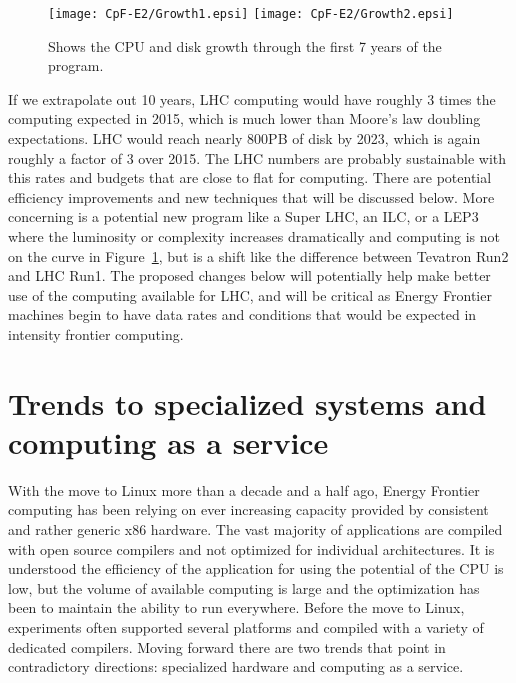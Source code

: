 \begin{figure}[htb]
\begin{center}
\texttt{[image: CpF-E2/Growth1.epsi]}
\texttt{[image: CpF-E2/Growth2.epsi]}
\caption{Shows the CPU and disk growth through the first 7 years of the program.}
\label{fig:growth}
\end{center}
\end{figure}



If we extrapolate out 10 years, LHC computing would have roughly 3 times the computing expected in 2015, 
which is much lower than Moore's law doubling expectations.    LHC would reach nearly 800PB of disk by 2023, 
which is again roughly a factor of 3 over 2015.    The LHC numbers are probably sustainable with this rates 
and budgets that are close to flat for computing.   There are potential efficiency improvements and new 
techniques that will be discussed below.    More concerning is a potential new program like a Super LHC, an ILC, or a 
LEP3 where the luminosity or complexity increases dramatically and computing is not on the curve in Figure~\ref{fig:growth},
 but is a shift like the difference between Tevatron Run2 and LHC Run1.    The proposed changes below will 
potentially help make better use of the computing available for LHC, and will be critical as Energy 
Frontier machines begin to have data rates and conditions that would be expected in intensity frontier computing.


\section{Trends to specialized systems and computing as a service}
\label{sec:comp-clouds}

With the move to Linux more than a decade and a half ago, Energy Frontier computing has been relying on ever increasing capacity provided by consistent and rather generic x86 hardware.    The vast majority of applications are compiled with open source compilers and not optimized for individual architectures.   It is understood the efficiency of the application for using the potential of the CPU is low, but the volume of available computing is large and the optimization has been to maintain the ability to run everywhere.  Before the move to Linux, experiments often supported several platforms and compiled with a variety of dedicated compilers.     Moving forward there are two trends that point in contradictory directions: specialized hardware and computing as a service. 

